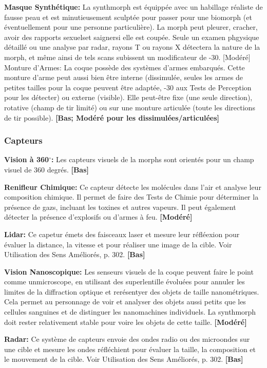 \textbf{Masque Synthétique:} La synthmorph est équippée avec un habillage réaliste de fausse peau et est minutieusement sculptée pour passer pour une biomorph (et éventuellement pour une personne particulière). La morph peut pleurer, cracher, avoir des rapports sexuelset saignersi elle est coupée. Seule un examen phgysique détaillé ou une analyse par radar, rayons T ou rayons X détectera la nature de la morph, et même ainsi de tels scans subissent un modificateur de -30. [Modéré] Monture d'Armes: La coque possède des systèmes d'armes embarqués. Cette monture d'arme peut aussi bien être interne (dissimulée, seules les armes de petites tailles pour la coque peuvent être adaptée, -30 aux Tests de Perception pour les détecter) ou externe (visible). Elle peut-être fixe (une seule direction), rotative (champ de tir limité) ou sur une monture articulée (toute les directions de tir possible). \textbf{[Bas; Modéré pour les dissimulées/articulées]} 

\subsubsection{Capteurs} 

\textbf{{Vision à 360$^{\circ}$:}} Les capteurs visuels de la morphs sont orientés pour un champ visuel de 360 degrés. \textbf{[Bas]} 

\textbf{Renifleur Chimique:} Ce capteur détecte les molécules dans l'air et analyse leur composition chimique. Il permet de faire des Tests de Chimie pour déterminer la présence de gazs, incluant les toxines et autres vapeurs. Il peut également détecter la présence d'explosifs ou d'armes à feu. \textbf{[Modéré]} 

\textbf{Lidar:} Ce capetur émets des faisceaux laser et mesure leur réfléexion pour évaluer la distance, la vitesse et pour réaliser une image de la cible. Voir Utilisation des Sens Améliorés, p. 302. \textbf{[Bas]} 

\textbf{Vision Nanoscopique:} Les senseurs visuels de la coque peuvent faire le point comme unmicroscope, en utilisant des superlentille évoluées pour annuler les limites de la diffraction optique et rerésentyer des objets de taille nanométriques. Cela permet au personnage de voir et analyser des objets aussi petits que les cellules sanguines et de distinguer les nanomachines individuels. La synthmorph doit rester relativement stable pour voire les objets de cette taille. \textbf{[Modéré]} 

\textbf{Radar:} Ce système de capteurs envoie des ondes radio ou des microondes sur une cible et mesure les ondes réfléchient pour évaluer la taille, la composition et le mouvement de la cible. Voir Utilisation des Sens Améliorés, p. 302. \textbf{[Bas]} 

